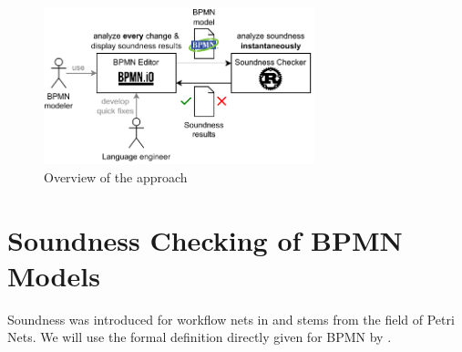 \documentclass[runningheads]{llncs}
\begin{document}
\cite{fahlandAnalysisDemandInstantaneous2011}




\begin{figure}[ht]
	\centering
	\includegraphics[width=0.7\textwidth]{images/overview}
	\caption{Overview of the approach}
	\label{fig:overview}
\end{figure}


\cite{corradiniClassificationBPMNCollaborations2018}


\section{Soundness Checking of BPMN Models} \label{sec:soundness}

Soundness was introduced for workflow nets in \cite{vanderaalstAPPLICATIONPETRINETS1998} and stems from the field of Petri Nets.
We will use the formal definition directly given for BPMN by \cite{corradiniClassificationBPMNCollaborations2018}.
\end{document}
